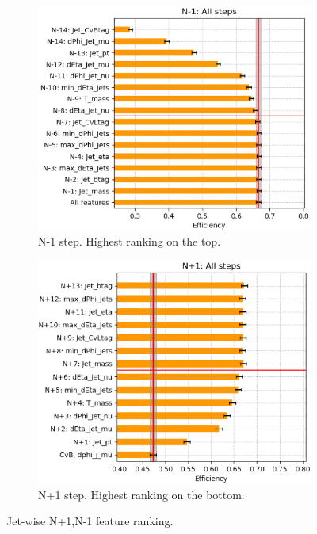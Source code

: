\begin{figure}[H]
    \centering
    \begin{subfigure}{0.9\linewidth}
        \includegraphics[width=1\linewidth]{fig//chap08-kin_reco/n_minus1.png}
        \caption{N-1 step. Highest ranking on the top.}
    \end{subfigure}
    \hfill
    \begin{subfigure}{0.9\linewidth}   
        \includegraphics[width=1\linewidth]{fig//chap08-kin_reco/n_plus1.png}
        \caption{N+1 step. Highest ranking on the bottom.}
    \end{subfigure}  
    \caption{Jet-wise N+1,N-1 feature ranking.}
    \label{fig:n_rank}
\end{figure}




